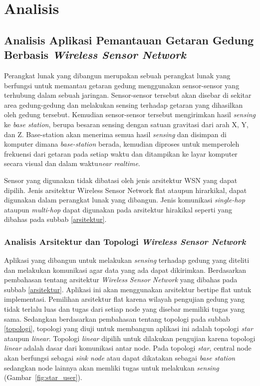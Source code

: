 \chapter{Analisis}

\section{Analisis Aplikasi Pemantauan Getaran Gedung Berbasis \textit{Wireless Sensor Network}}
Perangkat lunak yang dibangun merupakan sebuah perangkat lunak yang berfungsi untuk memantau getaran gedung menggunakan sensor-sensor yang terhubung dalam sebuah jaringan. Sensor-sensor tersebut akan disebar di sekitar area gedung-gedung dan melakukan sensing terhadap getaran yang dihasilkan oleh gedung tersebut. Kemudian sensor-sensor tersebut mengirimkan hasil \textit{sensing} ke \textit{base station}, berupa besaran sensing dengan satuan gravitasi dari arah X, Y, dan Z. Base-station akan menerima semua hasil \textit{sensing} dan disimpan di komputer dimana \textit{base-station} berada, kemudian diproses untuk memperoleh frekuensi dari getaran pada setiap waktu dan ditampikan ke layar komputer secara visual dan dalam waktu\textit{near realtime}. 

Sensor yang digunakan tidak dibatasi oleh jenis arsitektur WSN yang dapat dipilih. Jenis arsitektur Wireless Sensor Network flat ataupun hirarkikal, dapat digunakan dalam perangkat lunak yang dibangun. Jenis komunikasi \textit{single-hop} ataupun \textit{multi-hop} dapat digunakan pada arsitektur hirakikal seperti yang dibahas pada subbab \ref{arsitektur}.

\subsection{Analisis Arsitektur dan Topologi \textit{Wireless Sensor Network}}
Aplikasi yang dibangun untuk melakukan \textit{sensing} terhadap gedung yang diteliti dan melakukan komunikasi agar data yang ada dapat dikirimkan. Berdasarkan pembahasan tentang arsitektur \textit{Wireless Sensor Network} yang dibahas pada subbab \ref{arsitektur}. Aplikasi ini akan menggunakan arsitektur bertipe flat untuk implementasi. Pemilihan arsitektur flat karena wilayah pengujian gedung yang tidak terlalu luas dan tugas dari setiap node yang disebar memiliki tugas yang sama. Sedangkan berdasarkan pembahasan tentang topologi pada subbab \ref{topologi}, topologi yang diuji untuk membangun aplikasi ini adalah topologi \textit{star} ataupun \textit{linear}. Topologi \textit{linear} dipilih untuk dilakukan pengujian karena topologi \textit{linear} adalah dasar dari komunikasi antar node. Pada topologi \textit{star}, central node akan berfungsi sebagai \textit{sink node} atau dapat dikatakan sebagai \textit{base station} sedangkan node lainnya akan memliki tugas untuk melakukan \textit{sensing} (Gambar~\ref{fig:star_user}).

